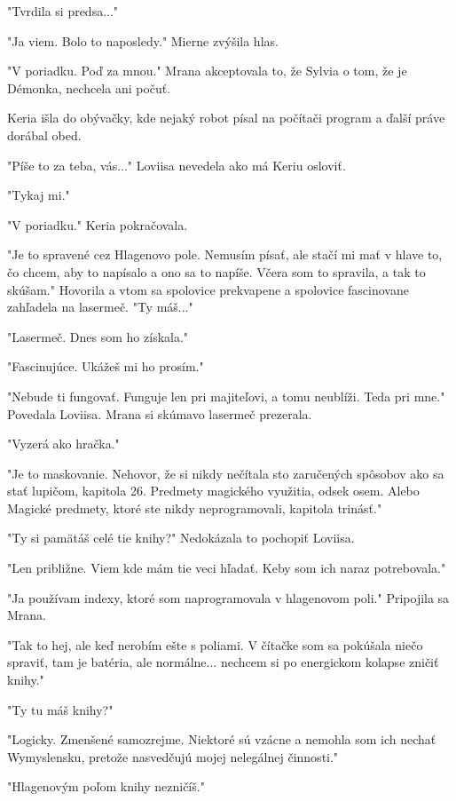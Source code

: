 \documentclass{book}
\begin{document}
"$ $Tvrdila si predsa..."$ $ 

"$ $Ja viem. Bolo to naposledy."$ $  Mierne zvýšila hlas.

"$ $V poriadku. Poď za mnou."$ $  Mrana akceptovala to, že Sylvia o tom, že je Démonka, nechcela ani počuť.

Keria išla do obývačky, kde nejaký robot písal na počítači program a ďalší práve dorábal obed.

"$ $Píše to za teba, vás..."$ $  Loviisa nevedela ako má Keriu osloviť.

"$ $Tykaj mi."$ $ 

"$ $V poriadku."$ $  Keria pokračovala.

"$ $Je to spravené cez Hlagenovo pole. Nemusím písať, ale stačí mi mať v hlave to, čo chcem, aby to napísalo a ono sa to napíše. Včera som to spravila, a tak to skúšam."$ $  Hovorila a vtom sa spolovice prekvapene a spolovice fascinovane zahľadela na lasermeč. "$ $Ty máš..."$ $ 

"$ $Lasermeč. Dnes som ho získala."$ $ 

"$ $Fascinujúce. Ukážeš mi ho prosím."$ $ 

"$ $Nebude ti fungovať. Funguje len pri majiteľovi, a tomu neublíži. Teda pri mne."$ $  Povedala Loviisa. Mrana si skúmavo lasermeč prezerala.

"$ $Vyzerá ako hračka."$ $ 

"$ $Je to maskovanie. Nehovor, že si nikdy nečítala sto zaručených spôsobov ako sa stať lupičom, kapitola 26. Predmety magického využitia, odsek osem. Alebo Magické predmety, ktoré ste nikdy neprogramovali, kapitola trinásť."$ $ 

"$ $Ty si pamätáš celé tie knihy?"$ $  Nedokázala to pochopiť Loviisa.

"$ $Len približne. Viem kde mám tie veci hľadať. Keby som ich naraz potrebovala."$ $ 

"$ $Ja používam indexy, ktoré som naprogramovala v hlagenovom poli."$ $  Pripojila sa Mrana.

"$ $Tak to hej, ale keď nerobím ešte s poliami. V čítačke som sa pokúšala niečo spraviť, tam je batéria, ale normálne... nechcem si po energickom kolapse zničiť knihy."$ $ 

"$ $Ty tu máš knihy?"$ $ 

"$ $Logicky. Zmenšené samozrejme. Niektoré sú vzácne a nemohla som ich nechať Wymyslensku, pretože nasvedčujú mojej nelegálnej činnosti."$ $ 

"$ $Hlagenovým poľom knihy nezničíš."$ $ 
\end{document}
